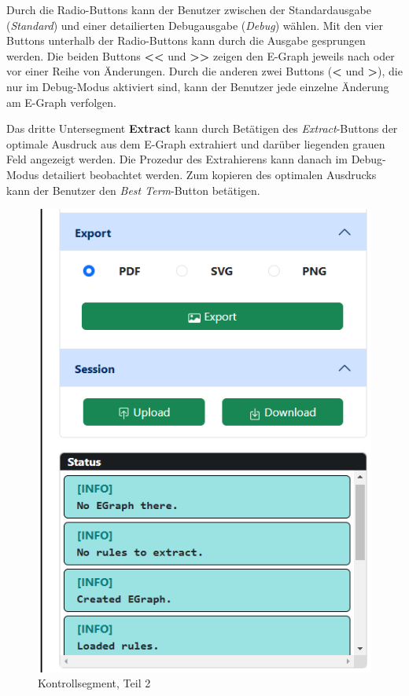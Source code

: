 Durch die Radio-Buttons kann der Benutzer zwischen der Standardausgabe (\textit{Standard}) und einer detailierten Debugausgabe (\textit{Debug}) wählen.
Mit den vier Buttons unterhalb der Radio-Buttons kann durch die Ausgabe gesprungen werden. Die beiden Buttons \textbf{<<} und \textbf{>>} zeigen den E-Graph jeweils nach oder vor einer 
Reihe von Änderungen. Durch die anderen zwei Buttons (\textbf{<} und \textbf{>}), die nur im Debug-Modus aktiviert sind, kann der Benutzer jede einzelne Änderung am E-Graph verfolgen. 

Das dritte Untersegment \textbf{Extract} kann durch Betätigen des \textit{Extract}-Buttons der optimale Ausdruck aus dem E-Graph extrahiert und darüber liegenden grauen Feld angezeigt werden.
Die Prozedur des Extrahierens kann danach im Debug-Modus detailiert beobachtet werden. Zum kopieren des optimalen Ausdrucks kann der Benutzer den \textit{Best Term}-Button betätigen.

\begin{figure}
    \vspace{-10mm}
    \begin{center}
      \includegraphics[scale=0.6]{../fig/control2.png}
    \end{center}
    \caption{Kontrollsegment, Teil 2}
    \label{fig:segment32}
\end{figure}

